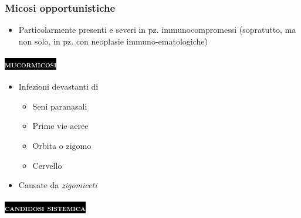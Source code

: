 \documentclass[italian,]{article}
\providecommand{\tightlist}{%
  \setlength{\itemsep}{0pt}\setlength{\parskip}{0pt}}
\newcommand{\pat}[1]{\colorbox{black}{\textcolor{white}{\textsc{#1}}}}
\begin{document}
\hypertarget{micosi-opportunistiche}{%
\subsubsection{Micosi opportunistiche}\label{micosi-opportunistiche}}

\begin{itemize}
\tightlist
\item
  Particolarmente presenti e severi in pz. immunocompromessi
  (sopratutto, ma non solo, in pz. con neoplasie immuno-ematologiche)
\end{itemize}

\hypertarget{section-3}{%
\paragraph{\texorpdfstring{\pat{mucormicosi}}{}}\label{section-3}}

\begin{itemize}
\tightlist
\item
  Infezioni devastanti di

  \begin{itemize}
  \tightlist
  \item
    Seni paranasali
  \item
    Prime vie aeree
  \item
    Orbita o zigomo
  \item
    Cervello
  \end{itemize}
\item
  Causate da \emph{zigomiceti}
\end{itemize}

\hypertarget{section-4}{%
\paragraph{\texorpdfstring{\pat{candidosi sistemica}}{}}\label{section-4}}
\end{document}
